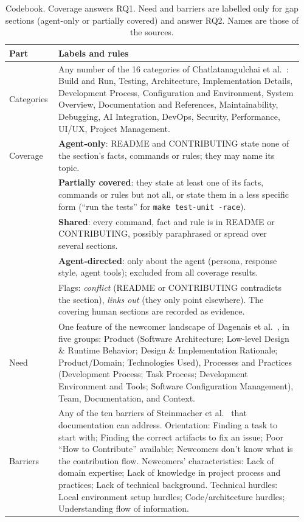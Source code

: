 \documentclass[sigconf,nonacm]{acmart}
\begin{document}
\begin{table}[t]
\caption{Codebook. Coverage answers RQ1. Need and barriers are labelled only for gap sections
(agent-only or partially covered) and answer RQ2. Names are those of the sources.}
\label{tab:codebook}
\small
\begin{tabular}{@{}p{0.16\linewidth}p{0.80\linewidth}@{}}
\toprule
Part & Labels and rules \\
\midrule
Categories & Any number of the 16 categories of Chatlatanagulchai et
al.~\cite{chatlatanagulchai2026agentreadmes}: Build and Run, Testing, Architecture, Implementation
Details, Development Process, Configuration and Environment, System Overview, Documentation and
References, Maintainability, Debugging, AI Integration, DevOps, Security, Performance, UI/UX,
Project Management. \\
\addlinespace
Coverage & \textbf{Agent-only}: README and CONTRIBUTING state none of the section's facts, commands
or rules; they may name its topic. \\
& \textbf{Partially covered}: they state at least one of its facts, commands or rules but not all,
or state them in a less specific form (``run the tests'' for \texttt{make test-unit -race}). \\
& \textbf{Shared}: every command, fact and rule is in README or CONTRIBUTING, possibly paraphrased
or spread over several sections. \\
& \textbf{Agent-directed}: only about the agent (persona, response style, agent tools); excluded
from all coverage results. \\
& Flags: \emph{conflict} (README or CONTRIBUTING contradicts the section), \emph{links out} (they
only point elsewhere). The covering human sections are recorded as evidence. \\
\addlinespace
Need & One feature of the newcomer landscape of Dagenais et al.~\cite{dagenais2010landscape}, in
five groups: Product (Software Architecture; Low-level Design \& Runtime Behavior; Design \&
Implementation Rationale; Product/Domain; Technologies Used), Processes and Practices (Development
Process; Task Process; Development Environment and Tools; Software Configuration Management), Team,
Documentation, and Context. \\
\addlinespace
Barriers & Any of the ten barriers of Steinmacher et al.~\cite{steinmacher2015barriers} that
documentation can address. Orientation: Finding a task to start with; Finding the correct artifacts
to fix an issue; Poor ``How to Contribute'' available; Newcomers don't know what is the contribution
flow. Newcomers' characteristics: Lack of domain expertise; Lack of knowledge in project process and
practices; Lack of technical background. Technical hurdles: Local environment setup hurdles;
Code/architecture hurdles; Understanding flow of information. \\
\bottomrule
\end{tabular}
\end{table}
\end{document}
